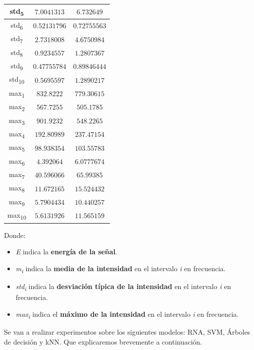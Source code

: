 \documentclass[12pt]{article}
\begin{document}
\begin{table}[!ht]
\begin{tabular}{||c c c||}
			\hline
			std\textsubscript{5} & $7.0041313$ & $6.732649$ \\
			\hline
			std\textsubscript{6} & $0.52131796$ & $0.72755563$ \\
			\hline
			std\textsubscript{7} & $2.7318008$ & $4.6750984$ \\
			\hline
			std\textsubscript{8} & $0.9234557$ & $1.2807367$ \\
			\hline
			std\textsubscript{9} & $0.47755784$ & $0.89846444$ \\
			\hline
			std\textsubscript{10} & $0.5695597$ & $1.2890217$ \\
			\hline
			max\textsubscript{1} & $832.8222$ & $779.30615$ \\
			\hline
			max\textsubscript{2} & $567.7255$ & $505.1785$ \\
			\hline
			max\textsubscript{3} & $901.9232$ & $548.2265$ \\
			\hline
			max\textsubscript{4} & $192.80989$ & $237.47154$ \\
			\hline
			max\textsubscript{5} & $98.938354$ & $103.55783$ \\
			\hline
			max\textsubscript{6} & $4.392064$ & $6.0777674$ \\
			\hline
			max\textsubscript{7} & $40.596066$ & $65.99385$ \\
			\hline
			max\textsubscript{8} & $11.672165$ & $15.524432$ \\
			\hline
			max\textsubscript{9} & $5.7904434$ & $10.440257$ \\
			\hline
			max\textsubscript{10} & $5.6131926$ & $11.565159$ \\
			\hline
		\end{tabular}
	\label{Tab:Features_1}
\end{table}
Donde:
\begin{itemize}
	\item \textit{E} indica la \textbf{energía de la señal}.
	\item \textit{m\textsubscript{i}} indica la \textbf{media de la intensidad} en el intervalo \textit{i} en frecuencia.
	\item \textit{std\textsubscript{i}} indica la \textbf{desviación típica de la intensidad} en el intervalo \textit{i} en frecuencia.
	\item \textit{max\textsubscript{i}} indica el \textbf{máximo de la intensidad} en el intervalo \textit{i} en frecuencia.
\end{itemize}	

\newpage
Se van a realizar experimentos sobre los siguientes modelos: RNA, SVM, Árboles de decisión y kNN. Que explicaremos brevemente a continuación.
\end{document}
